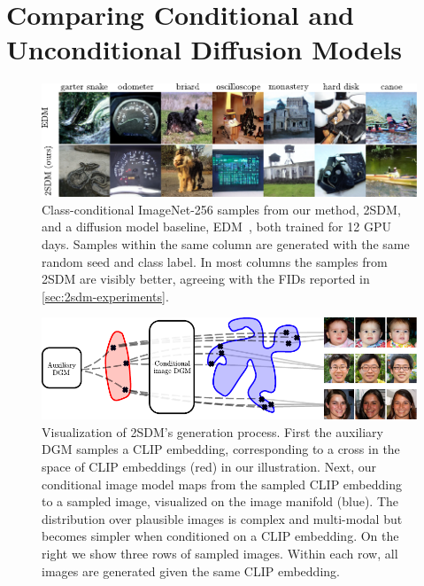 \chapter{Comparing Conditional and Unconditional Diffusion Models}

\begin{figure}[b]
    \includegraphics[width=\textwidth]{figs/2sdm/2SDM-main-fig.pdf}
    \caption{Class-conditional ImageNet-256 samples from our method, 2SDM, and a diffusion model baseline, EDM~\citep{karras2022elucidating}, both trained for 12 GPU days. Samples within the same column are generated with the same random seed and class label. In most columns the samples from 2SDM are visibly better, agreeing with the FIDs reported in \cref{sec:2sdm-experiments}.}
    \label{fig:latent-imagenet-samples}
\end{figure}


\begin{figure}[t]
    \centering
    \includegraphics{figs/2sdm/vcdm-diagram.pdf}
    \caption{Visualization of 2SDM's generation process. First the auxiliary DGM samples a CLIP embedding, corresponding to a cross in the space of CLIP embeddings (red) in our illustration. Next, our conditional image model maps from the sampled CLIP embedding to a sampled image, visualized on the image manifold (blue). The distribution over plausible images is complex and multi-modal but becomes simpler when conditioned on a CLIP embedding. On the right we show three rows of sampled images. Within each row, all images are generated given the same CLIP embedding.}
    \label{fig:samples}
\end{figure}


